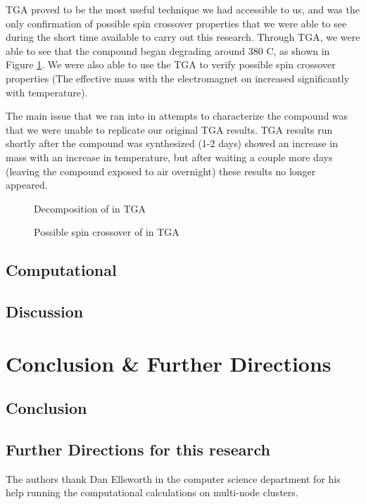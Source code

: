 \documentclass[journal=jacsat,manuscript=communication]{achemso}
\newcommand*\compound{\ch{Co(phen)2(NCS)2} }
\begin{document}
TGA proved to be the most useful technique we had accessible to us, and was the only confirmation of possible spin crossover properties that we were able to see during the short time available to carry out this research.  Through TGA, we were able to see that the compound began degrading around 380 \degree C, as shown in Figure \ref{fig:decomposition}. We were also able to use the TGA to verify possible spin crossover properties (The effective mass with the electromagnet on increased significantly with temperature).  

The main issue that we ran into in attempts to characterize the compound was that we were unable to replicate our original TGA results.  TGA results run shortly after the compound was synthesized (1-2 days) showed an increase in mass with an increase in temperature, but after waiting a couple more days (leaving the compound exposed to air overnight) these results no longer appeared.  

\begin{figure}
  \caption{Decomposition of \compound in TGA}
  \label{fig:decomposition}
\end{figure}

\begin{figure}
	\caption{Possible spin crossover of \compound in TGA}
	\label{fig:TGA_crossover}
\end{figure}

\subsection{Computational}
\subsection{Discussion}
\section{Conclusion \& Further Directions}
\subsection{Conclusion}
\subsection{Further Directions for this research}




\begin{acknowledgement}
The authors thank Dan Ellsworth in the computer science department for his help running the computational calculations on multi-node clusters.  

\end{acknowledgement}
\end{document}
